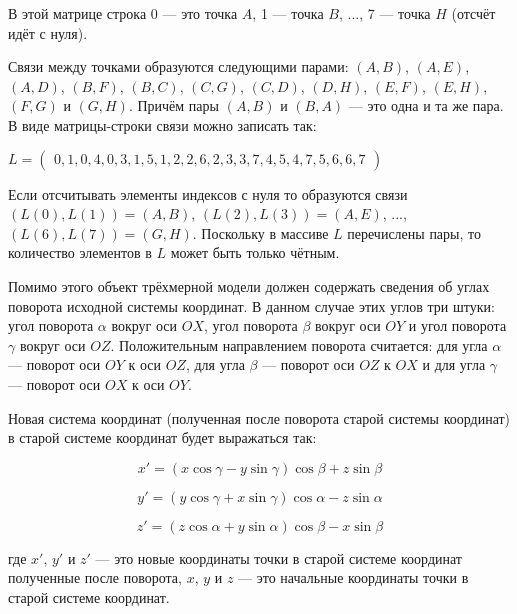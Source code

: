 В этой матрице строка 0 --- это точка $A$, 1 --- точка $B$, ..., 7 --- точка $H$ (отсчёт идёт с нуля).

Связи между точками образуются следующими парами: $(A, B)$, $(A, E)$, $(A, D)$, $(B, F)$, $(B, C)$, $(C, G)$, $(C, D)$, $(D, H)$, $(E, F)$, $(E, H)$, $(F, G)$ и $(G, H)$. Причём пары $(A, B)$ и $(B, A)$ --- это одна и та же пара. В виде матрицы-строки связи можно записать так:

$L =
\begin{pmatrix}
0, 1, 0, 4, 0, 3, 1, 5, 1, 2, 2, 6, 2, 3, 3, 7, 4, 5, 4, 7, 5, 6, 6, 7
\end{pmatrix}$

Если отсчитывать элементы индексов с нуля то образуются связи $(L(0), L(1)) = (A, B)$, $(L(2), L(3)) = (A, E)$, ..., $(L(6), L(7)) = (G, H)$. Поскольку в массиве $L$ перечислены пары, то количество элементов в $L$ может быть только чётным.

Помимо этого объект трёхмерной модели должен содержать сведения об углах поворота исходной системы координат. В данном случае этих углов три штуки: угол поворота $\alpha$ вокруг оси $OX$, угол поворота $\beta$ вокруг оси $OY$ и угол поворота $\gamma$ вокруг оси $OZ$. Положительным направлением поворота считается: для угла $\alpha$ --- поворот оси $OY$ к оси $OZ$, для угла $\beta$ --- поворот оси $OZ$ к $OX$ и для угла $\gamma$ --- поворот оси $OX$ к оси $OY$.

Новая система координат (полученная после поворота старой системы координат) в старой системе координат будет выражаться так:

$$x' = (x \cos{\gamma} - y \sin{\gamma}) \cos{\beta} + z \sin{\beta}$$

$$y' = (y \cos{\gamma} + x \sin{\gamma}) \cos{\alpha} - z \sin{\alpha}$$

$$z' = (z \cos{\alpha} + y \sin{\alpha}) \cos{\beta} - x \sin{\beta}$$

где $x'$, $y'$ и $z'$ --- это новые координаты точки в старой системе координат полученные после поворота, $x$, $y$ и $z$ --- это начальные координаты точки в старой системе координат.
